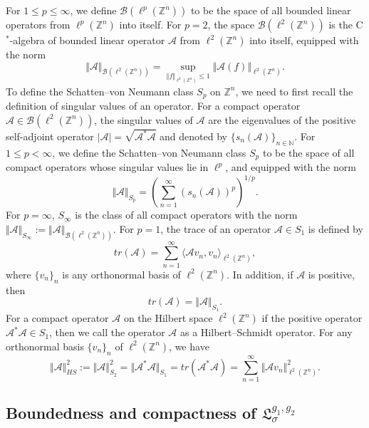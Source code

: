 \documentclass[a4paper,11pt, reqno]{amsart}
\theoremstyle{plain}
\theoremstyle{definition}
\theoremstyle{remark}
\def \Z{{\mathbb Z}}
\begin{document}
For $1 \leq p \leq \infty$, we define $\mathcal{B}(\ell^p(\Z^n))$ to be the space of all bounded linear operators from $\ell^p(\Z^n)$ into itself. For $p=2$, the space $\mathcal{B}(\ell^2(\Z^n))$ is the C$^*$-algebra of bounded linear operator $\mathcal{A}$ from $\ell^2(\Z^n)$ into itself, equipped with the norm 
\[ \Vert \mathcal{A} \Vert_{\mathcal{B}(\ell^2(\Z^n))}= \sup_{\Vert f \Vert_{\ell^2(\Z^n)} \leq 1} \Vert \mathcal{A}(f) \Vert_{\ell^2(\Z^n)}. \]
To define the Schatten--von Neumann class $S_p$ on $\Z^n$, we need to first recall the definition of singular values of an operator. For a compact operator $\mathcal{A} \in \mathcal{B}(\ell^2(\Z^n))$, the singular values of $\mathcal{A}$ are the eigenvalues of the positive self-adjoint operator $|\mathcal{A}|=\sqrt{\mathcal{A}^* \mathcal{A}}$ and denoted by $\{ s_n(\mathcal{A}) \}_{n \in \mathbb{N}}$. For $1 \leq p < \infty$, we define the Schatten--von Neumann class $S_p$ to be the space of all compact operators whose singular values lie in $\ell^p$, and equipped with the norm 
\[ \Vert \mathcal{A} \Vert_{S_p}= \left(\sum_{n=1}^\infty  (s_n(\mathcal{A}))^p \right)^{1/p}. \]
For $p=\infty$, $S_\infty$ is the class of all compact operators with the norm  $\Vert \mathcal{A} \Vert_{S_\infty} :=\Vert \mathcal{A} \Vert_{\mathcal{B}(\ell^2(\Z^n))}$. For $p = 1$, the trace of an operator $\mathcal{A} \in S_1$ is defined by 
\[ tr(\mathcal{A}) = \sum_{n=1}^\infty \langle \mathcal{A}  v_n, v_n  \rangle_{\ell^2(\Z^n)}, \]
where $\{v_n \}_n$ is any orthonormal basis of $\ell^2(\Z^n)$. In addition, if $\mathcal{A}$ is positive, then 
\[ tr(\mathcal{A})=\Vert \mathcal{A} \Vert_{S_1} .\]
For a compact operator $\mathcal{A}$ on the Hilbert space $\ell^2(\Z^n)$ if the positive operator $\mathcal{A}^*  \mathcal{A} \in S_1$, then we call the operator $\mathcal{A}$ as a Hilbert--Schmidt operator. For any orthonormal basis $\{v_n \}_n$ of $\ell^2(\Z^n)$, we have 
\[ \Vert \mathcal{A}\Vert_{HS}^2 :=\Vert \mathcal{A}\Vert_{S_2}^2= \Vert \mathcal{A}^* \mathcal{A} \Vert_{S_1}= tr(\mathcal{A}^* \mathcal{A}) = \sum_{n=1}^\infty \Vert \mathcal{A} v_n\Vert^2_{\ell^2(\Z^n)}. \]

\subsection{Boundedness and compactness of $\mathfrak{L}^{g_1, g_2}_{\sigma}$}
\end{document}
